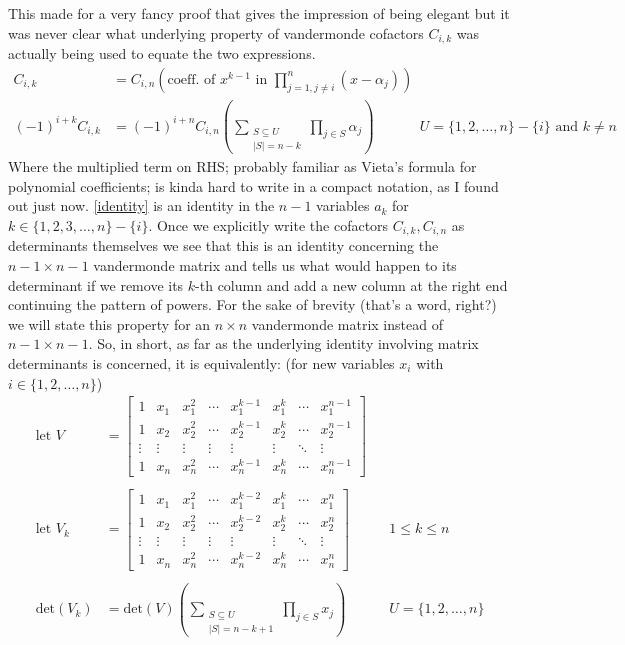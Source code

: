 \documentclass{article}
\begin{document}
\\\\
This made for a very fancy proof that gives the impression of being elegant but it was never clear what underlying property of vandermonde cofactors $C_{i,k}$ was actually being used to equate the two expressions. 
\begin{align}
    C_{i,k} &= C_{i,n}\left(\textrm{coeff. of $x^{k-1}$ in } \prod_{j=1, j\neq i}^{n} (x-\alpha_j)\right) \\
    (-1)^{i+k} C_{i,k} &= (-1)^{i+n} C_{i,n}\left(\sum_{\substack{S \subseteq U \\ |S| = n-k}}\prod_{j\in S} \alpha_j\right) && U = \{1,2,\dots,n\} - \{i\} \textrm{ and } k\neq n \label{identity}
\end{align}
Where the multiplied term on RHS; probably familiar as Vieta's formula for polynomial coefficients; is kinda hard to write in a compact notation, as I found out just now. \eqref{identity} is an identity in the $n-1$ variables $a_k$ for $k\in\{1,2,3,\dots,n\}-\{i\}$. Once we explicitly write the cofactors $C_{i,k}, C_{i,n}$ as determinants themselves we see that this is an identity concerning the $n-1 \times n-1$ vandermonde matrix and tells us what would happen to its determinant if we remove its $k$-th column and add a new column at the right end continuing the pattern of powers. For the sake of brevity (that's a word, right?) we will state this property for an $n\times n$ vandermonde matrix instead of $n-1 \times n-1$. So, in short, as far as the underlying identity involving matrix determinants is concerned, it is equivalently: (for new variables $x_i$ with $i\in\{1,2,\dots,n\}$)
\begin{align*}
    \textrm{let } V &= \begin{bmatrix}
        1 & x_1 & x_1^2 & \cdots & x_1^{k-1} & x_1^{k} & \cdots & x_1^{n-1} \\
        1 & x_2 & x_2^2 & \cdots & x_2^{k-1} & x_2^{k} & \cdots & x_2^{n-1} \\
        \vdots & \vdots & \vdots & \vdots & \vdots & \vdots & \ddots & \vdots \\
        1 & x_{n} & x_{n}^2 & \cdots & x_{n}^{k-1} & x_{n}^{k} & \cdots & x_{n}^{n-1}
    \end{bmatrix}\\\\
    \textrm{let } V_k &= \begin{bmatrix}
        1 & x_1 & x_1^2 & \cdots & x_1^{k-2} & x_1^{k} & \cdots & x_1^{n} \\
        1 & x_2 & x_2^2 & \cdots & x_2^{k-2} & x_2^{k} & \cdots & x_2^{n} \\
        \vdots & \vdots & \vdots & \vdots & \vdots & \vdots & \ddots & \vdots \\
        1 & x_{n} & x_{n}^2 & \cdots & x_{n}^{k-2} & x_{n}^{k} & \cdots & x_{n}^{n}
    \end{bmatrix} && 1\leq k\leq n\\\\
    \textrm{det}(V_k) &= \textrm{det}(V)\left(
    \sum_{\substack{S \subseteq U \\ |S| = n-k+1}}\prod_{j\in S} x_j
    \right) && U = \{1,2,\dots,n\}
\end{align*}
\end{document}
